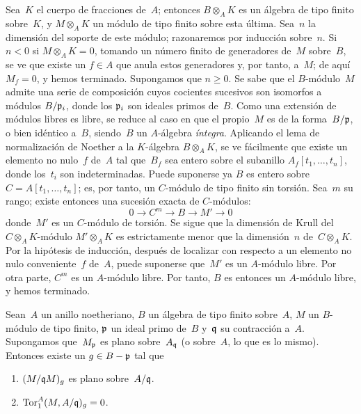 Sea~$K$ el cuerpo de fracciones de~$A$; entonces $B\otimes_A K$ es un
álgebra de tipo finito sobre~$K$, y $M\otimes_A K$ un módulo de tipo finito
sobre esta última. Sea~$n$ la dimensión del soporte de este módulo;
razonaremos por inducción sobre~$n$.
Si $n<0$
\ie si $M\otimes_A K=0$, tomando un número finito de generadores de~$M$
sobre~$B$, se ve que existe un $f\in A$ que anula estos generadores y, por
tanto, a~$M$; de aquí $M_f=0$, y hemos terminado. Supongamos que $n\geq0$.
Se sabe que el $B$-módulo~$M$ admite una serie de composición cuyos
cocientes sucesivos son isomorfos a módulos $B/\mathfrak{p}_i$, donde los
$\mathfrak{p}_i$ son ideales primos de~$B$.
Como una extensión de módulos libres es libre, se reduce al caso en que el
propio~$M$ es de la forma~$B/\mathfrak{p}$, o bien idéntico a~$B$, siendo~$B$ un
$A$-álgebra \emph{íntegra}. Aplicando el lema de normalización de Noether a
la $K$-álgebra $B\otimes_A K$, se ve fácilmente que existe un elemento no
nulo~$f$ de~$A$ tal que~$B_f$ sea entero sobre el subanillo
$A_f[t_1,\dots,t_n]$, donde los~$t_i$ son indeterminadas. Puede suponerse ya
$B$ es entero sobre
$C=A[t_1,\dots,t_n]$; es, por tanto, un $C$-módulo de tipo finito sin
torsión.
Sea~$m$ su rango; existe entonces una sucesión exacta de $C$-módulos:
$$
0\to C^m\to B\to M'\to0
$$
donde~$M'$ es un $C$-módulo de torsión. Se sigue que la dimensión de Krull
del $C\otimes_A K$-módulo $M'\otimes_A K$ es estrictamente menor que la
dimensión~$n$ de~$C\otimes_A K$. Por la hipótesis de inducción, después de
localizar con respecto a un elemento no nulo conveniente~$f$ de~$A$, puede
suponerse que~$M'$ es un $A$-módulo
libre. Por otra parte, $C^m$ es un $A$-módulo libre. Por tanto, $B$ es
entonces un $A$-módulo libre, y hemos terminado.

\begin{lemme}
\label{IV.6.8}
Sean~$A$ un anillo noetheriano, $B$ un álgebra de tipo finito sobre~$A$,
$M$ un $B$-módulo de tipo finito, $\mathfrak{p}$ un ideal primo de~$B$ y~$\mathfrak{q}$
su contracción a~$A$. Supongamos que~$M_{\mathfrak{p}}$ es plano
sobre~$A_{\mathfrak{q}}$ (o sobre~$A$, lo que es lo mismo). Entonces existe un
$g\in B-\mathfrak{p}$ tal que
\begin{enumerate}
\item[(a)] $(M/\mathfrak{q}M)_g$ es plano sobre~$A/\mathfrak{q}$.
\item[(b)] $\operatorname{Tor}_1^A(M,A/\mathfrak{q})_g=0$.
\end{enumerate}
\end{lemme}

